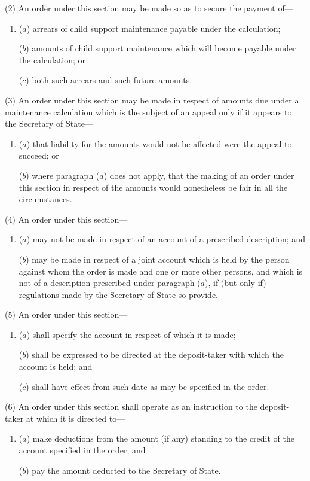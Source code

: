 \documentclass[a4paper]{article}
\begin{document}
(2) An order under this section may be made so as to secure the payment of---
\begin{enumerate}\item[]
($a$) arrears of child support maintenance payable under the calculation;

($b$) amounts of child support maintenance which will become payable under the
calculation; or

($c$) both such arrears and such future amounts.
\end{enumerate}

(3) An order under this section may be made in respect of amounts due under a maintenance calculation which is the subject of an appeal only if it appears to the Secretary of State---
\begin{enumerate}\item[]
($a$) that liability for the amounts would not be affected were the appeal to succeed;
or

($b$) where paragraph ($a$) does not apply, that the making of an order under this
section in respect of the amounts would nonetheless be fair in all the
circumstances.
\end{enumerate}

(4) An order under this section---
\begin{enumerate}\item[]
($a$) may not be made in respect of an account of a prescribed description; and

($b$) may be made in respect of a joint account which is held by the person against whom the order is made and one or more other persons, and which is not of a description prescribed under paragraph ($a$), if (but only if) regulations made by the Secretary of State so provide.
\end{enumerate}

(5) An order under this section---
\begin{enumerate}\item[]
($a$) shall specify the account in respect of which it is made;

($b$) shall be expressed to be directed at the deposit-taker with which the account is held; and

($c$) shall have effect from such date as may be specified in the order.
\end{enumerate}

(6) An order under this section shall operate as an instruction to the deposit-taker at which it is directed to---
\begin{enumerate}\item[]
($a$) make deductions from the amount (if any) standing to the credit of the account specified in the order; and

($b$) pay the amount deducted to the Secretary of State.
\end{enumerate}
\end{document}
